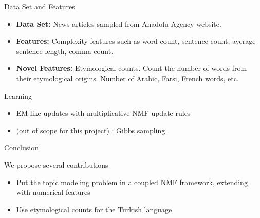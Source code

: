\documentclass[pdf]{beamer}
\begin{document}
\begin{frame}{Data Set and Features}
	
	\begin{itemize}
		\item {\bf Data Set:} News articles sampled from Anadolu Agency website. 
		\item {\bf Features:} Complexity features such as word count, sentence count, average sentence length, comma count.
		\item {\bf Novel Features:} Etymological counts. Count the number of words from their etymological origins. Number of Arabic, Farsi, French words, etc.
	\end{itemize}
	
\end{frame}

\begin{frame}{Learning}
	
	\begin{itemize}
		\item EM-like updates with multiplicative NMF update rules 
		\item (out of scope for this project) : Gibbs sampling
	\end{itemize}
	
\end{frame}

\begin{frame}{Conclusion}
	
	We propose several contributions
	\begin{itemize}
		\item Put the topic modeling problem in a coupled NMF framework, extending with numerical features
		\item Use etymological counts for the Turkish language
	\end{itemize}
	
\end{frame}

{}

\end{document}

